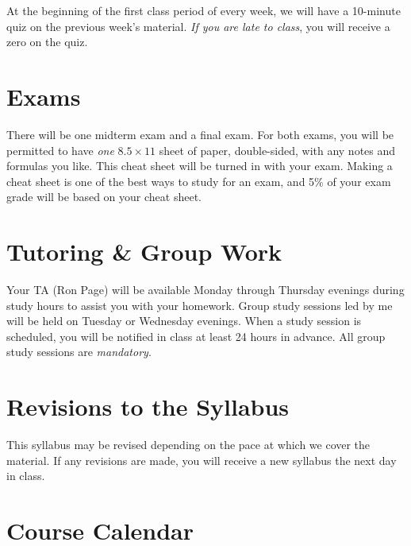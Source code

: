 \documentclass[11pt]{article}
\begin{document}
At the beginning of the first class period of every week, we will have a 10-minute quiz on the previous week's material. \emph{If you are late to class}, you will receive a zero on the quiz.


\section{Exams}

There will be one midterm exam and a final exam. For both exams, you will be permitted to have \emph{one} $8.5 \times 11$ sheet of paper, double-sided, with any notes and formulas you like. This cheat sheet will be turned in with your exam. Making a cheat sheet is one of the best ways to study for an exam, and 5\% of your exam grade will be based on your cheat sheet.


\section{Tutoring \& Group Work}

Your TA (Ron Page) will be available Monday through Thursday evenings during study hours to assist you with your homework. Group study sessions led by me will be held on Tuesday or Wednesday evenings. When a study session is scheduled, you will be notified in class at least 24 hours in advance. All group study sessions are \emph{mandatory}.


\section{Revisions to the Syllabus}

This syllabus may be revised depending on the pace at which we cover the material. If any revisions are made, you will receive a new syllabus the next day in class.


\section{Course Calendar}
\end{document}

